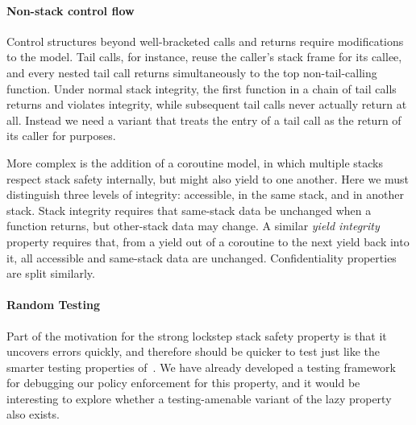 \documentclass[acmsmall,review,anonymous]{acmart}\settopmatter{printfolios=true,printccs=false,printacmref=false}
\begin{document}
{  \paragraph{Non-stack control flow}

    Control structures beyond well-bracketed calls and returns require
    modifications to the model. Tail calls, for instance, reuse the caller's
    stack frame for its callee, and every nested tail call returns
    simultaneously to the top non-tail-calling function. Under normal stack
    integrity, the first function in a chain of tail calls returns and violates
    integrity, while subsequent tail calls never actually return at all.
    Instead we need a variant that treats the entry of a tail call as the
    return of its caller for purposes.

    More complex is the addition of a coroutine model, in which multiple stacks
    respect stack safety internally, but might also yield to one another.
    Here we must distinguish three levels of integrity: accessible, in the same
    stack, and in another stack. Stack integrity requires that same-stack data
    be unchanged when a function returns, but other-stack data may change. A
    similar {\em yield integrity} property requires that, from a yield out of
    a coroutine to the next yield back into it, all accessible and same-stack
    data are unchanged. Confidentiality properties are split similarly.

  \paragraph{Random Testing}

  Part of the motivation for the strong lockstep stack safety property
  is that it uncovers errors quickly, and therefore should be quicker
  to test just like the smarter testing properties
  of~\citet{TestingNI:ICFP}. We have already developed a testing
  framework for debugging our policy enforcement for this property, and
  it would be interesting to explore whether a testing-amenable variant
  of the lazy property also exists.
    
}
\end{document}
